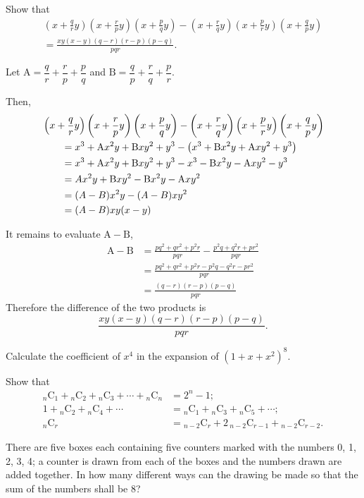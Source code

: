 \documentclass[DIN, pagenumber=false, fontsize=11pt, parskip=half]{scrartcl}
\begin{document}
\begin{problems}[from=1,step=1]
    \problem[10] Show that
    \begin{multline*}
        \left(x+\frac{q}{r}y\right)\left(x+\frac{r}{p}y\right)\left(x+\frac{p}{q}y\right)
        - \left(x+\frac{r}{q}y\right)\left(x+\frac{p}{r}y\right)\left(x+\frac{q}{p}y\right)\\
        = \frac{xy(x-y)(q-r)(r-p)(p-q)}{pqr}.
    \end{multline*}

    \answer 
    Let $\mathrm{A} = \dfrac{q}{r} + \dfrac{r}{p} + \dfrac{p}{q}$ and $\mathrm{B} = \dfrac{q}{p} + \dfrac{r}{q} + \dfrac{p}{r}$. 
   
    Then,
    \begin{align*}
        \MoveEqLeft
        \left(x+\frac{q}{r}y\right)\left(x+\frac{r}{p}y\right)\left(x+\frac{p}{q}y\right)
        - \left(x+\frac{r}{q}y\right)\left(x+\frac{p}{r}y\right)\left(x+\frac{q}{p}y\right)\\ 
        &= x^3 + \mathrm{A}x^2y + \mathrm{B}xy^2 + y^3 - \left(x^3 + \mathrm{B}x^2y + \mathrm{A}xy^2 + y^3\right)\\ 
        &= x^3 + \mathrm{A}x^2y + \mathrm{B}xy^2 + y^3 - x^3 - \mathrm{B}x^2y - \mathrm{A}xy^2 - y^3\\ 
        &= Ax^2y + \mathrm{B}xy^2 - \mathrm{B}x^2y - \mathrm{A}xy^2\\
        &= (A-B)x^2y - (A-B)xy^2\\ 
        &= (A-B)xy(x-y)
    \end{align*}

    It remains to evaluate $\mathrm{A}-\mathrm{B}$,
    \begin{align*}
        \mathrm{A}-\mathrm{B} &= \frac{pq^2 + qr^2 + p^2r}{pqr} - \frac{p^2q + q^2r + pr^2}{pqr}\\  
        &= \frac{pq^2 + qr^2 + p^2r - p^2q - q^2r - pr^2}{pqr}\\ 
        &= \frac{(q-r)(r-p)(p-q)}{pqr}
    \end{align*}
    Therefore the difference of the two products is
    \[
        \frac{xy(x-y)(q-r)(r-p)(p-q)}{pqr}.
    \]

    \problem[26] Calculate the coefficient of $x^4$ in the expansion of $(1+x+x^2)^8$.

    \problem[29] Show that
    \begin{align*}
        {}_n\mathrm{C}_1 + {}_n\mathrm{C}_2 + {}_n\mathrm{C}_3 + \dotsb + {}_n\mathrm{C}_n &= 2^n - 1;\\
        1 + {}_n\mathrm{C}_2 + {}_n\mathrm{C}_4 + \dotsb &= {}_n\mathrm{C}_1 + {}_n\mathrm{C}_3 + {}_n\mathrm{C}_5 + \dotsb;\\
        {}_n\mathrm{C}_r &= {}_{n-2}\mathrm{C}_r + 2\,{}_{n-2}\mathrm{C}_{r-1} + {}_{n-2}\mathrm{C}_{r-2}.
    \end{align*}

    \problem[30] There are five boxes each containing five counters marked with the numbers 0, 1, 2, 3, 4; a counter is drawn from each of the boxes and the numbers drawn are added together. In how many different ways can the drawing be made so that the sum of the numbers shall be 8?
\end{problems}
\end{document}
